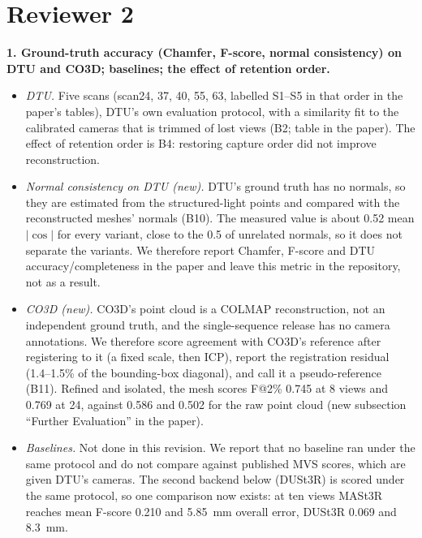 \documentclass[11pt,a4paper]{article}
\newcommand{\request}[1]{\par\medskip\noindent\textbf{#1}}
\begin{document}
\section{Reviewer 2}

\request{1. Ground-truth accuracy (Chamfer, F-score, normal consistency) on DTU and
CO3D; baselines; the effect of retention order.}

\begin{itemize}
\item \textit{DTU.} Five scans (scan24, 37, 40, 55, 63, labelled S1--S5 in that order in the
  paper's tables), DTU's own evaluation protocol,
  with a similarity fit to the calibrated cameras that is trimmed of lost views
  (B2; table in the paper). The effect of retention order is B4: restoring
  capture order did not improve reconstruction.
\item \textit{Normal consistency on DTU (new).} DTU's ground truth has no normals, so they
  are estimated from the structured-light points and compared with the
  reconstructed meshes' normals (B10). The measured value is about 0.52 mean $|\cos|$ for every variant, close
  to the 0.5 of unrelated normals, so it does not separate the variants. We
  therefore report Chamfer, F-score and DTU accuracy/completeness in the paper
  and leave this metric in the repository, not as a result.
\item \textit{CO3D (new).} CO3D's point cloud is a COLMAP reconstruction, not an
  independent ground truth, and the single-sequence release has no camera
  annotations. We therefore score agreement with CO3D's reference after
  registering to it (a fixed scale, then ICP), report the registration residual
  (1.4--1.5\% of the bounding-box diagonal), and call it a pseudo-reference (B11).
  Refined and isolated, the mesh scores F@2\% 0.745 at
  8 views and 0.769 at 24, against 0.586 and 0.502 for the raw point cloud
  (new subsection ``Further Evaluation'' in the paper).
\item \textit{Baselines.} Not done in this revision. We report that no baseline ran under
  the same protocol and do not compare against published MVS scores, which are
  given DTU's cameras. The second backend below (DUSt3R) is scored under the
  same protocol, so one comparison now exists: at ten views MASt3R reaches
  mean F-score 0.210 and 5.85~mm overall error, DUSt3R 0.069 and 8.3~mm.
\end{itemize}
\end{document}
